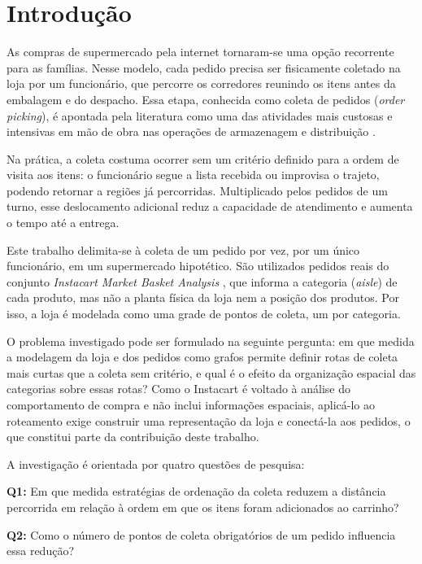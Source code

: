 \section{Introdução}
\label{introducao}

As compras de supermercado pela internet tornaram-se uma opção recorrente para as famílias. Nesse modelo, cada pedido precisa ser fisicamente coletado na loja por um funcionário, que percorre os corredores reunindo os itens antes da embalagem e do despacho. Essa etapa, conhecida como coleta de pedidos (\textit{order picking}), é apontada pela literatura como uma das atividades mais custosas e intensivas em mão de obra nas operações de armazenagem e distribuição \citep{dekoster2007}.

Na prática, a coleta costuma ocorrer sem um critério definido para a ordem de visita aos itens: o funcionário segue a lista recebida ou improvisa o trajeto, podendo retornar a regiões já percorridas. Multiplicado pelos pedidos de um turno, esse deslocamento adicional reduz a capacidade de atendimento e aumenta o tempo até a entrega.

Este trabalho delimita-se à coleta de um pedido por vez, por um único funcionário, em um supermercado hipotético. São utilizados pedidos reais do conjunto \textit{Instacart Market Basket Analysis} \citep{instacart2017}, que informa a categoria (\textit{aisle}) de cada produto, mas não a planta física da loja nem a posição dos produtos. Por isso, a loja é modelada como uma grade de pontos de coleta, um por categoria.

O problema investigado pode ser formulado na seguinte pergunta: em que medida a modelagem da loja e dos pedidos como grafos permite definir rotas de coleta mais curtas que a coleta sem critério, e qual é o efeito da organização espacial das categorias sobre essas rotas? Como o Instacart é voltado à análise do comportamento de compra e não inclui informações espaciais, aplicá-lo ao roteamento exige construir uma representação da loja e conectá-la aos pedidos, o que constitui parte da contribuição deste trabalho.

A investigação é orientada por quatro questões de pesquisa:

\noindent\textbf{Q1:} Em que medida estratégias de ordenação da coleta reduzem a distância percorrida em relação à ordem em que os itens foram adicionados ao carrinho?

\noindent\textbf{Q2:} Como o número de pontos de coleta obrigatórios de um pedido influencia essa redução?

